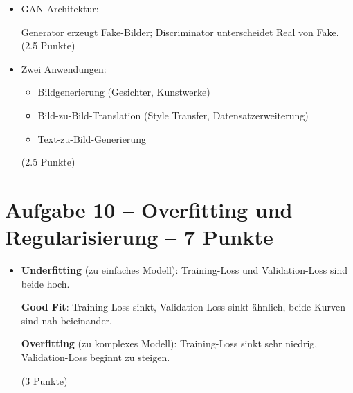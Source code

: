 \begin{itemize}
\item [b)] GAN-Architektur:
\begin{center}
\end{center}
Generator erzeugt Fake-Bilder; Discriminator unterscheidet Real von Fake. (2.5 Punkte)
\end{itemize}

\begin{itemize}
\item [c)] Zwei Anwendungen:
\begin{itemize}
  \item Bildgenerierung (Gesichter, Kunstwerke)
  \item Bild-zu-Bild-Translation (Style Transfer, Datensatzerweiterung)
  \item Text-zu-Bild-Generierung
\end{itemize}
(2.5 Punkte)
\end{itemize}

\newpage

\section*{Aufgabe 10 -- Overfitting und Regularisierung -- 7 Punkte}

\begin{itemize}
\item [a)] 

\textbf{Underfitting} (zu einfaches Modell): Training-Loss und Validation-Loss sind beide hoch.

\textbf{Good Fit}: Training-Loss sinkt, Validation-Loss sinkt ähnlich, beide Kurven sind nah beieinander.

\textbf{Overfitting} (zu komplexes Modell): Training-Loss sinkt sehr niedrig, Validation-Loss beginnt zu steigen.

\begin{center}
\end{center}
(3 Punkte)
\end{itemize}

